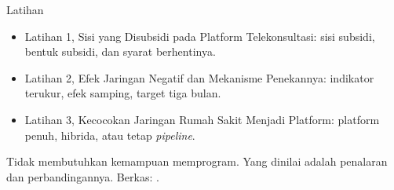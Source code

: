\documentclass[aspectratio=169, table, 12pt]{beamer}
\begin{document}
\begin{frame}{{\Large Latihan}}
  \vspace{6pt}
  \begin{itemize}
    \item Latihan 1, Sisi yang Disubsidi pada Platform Telekonsultasi: sisi subsidi, bentuk subsidi, dan syarat berhentinya.
    \item Latihan 2, Efek Jaringan Negatif dan Mekanisme Penekannya: indikator terukur, efek samping, target tiga bulan.
    \item Latihan 3, Kecocokan Jaringan Rumah Sakit Menjadi Platform: platform penuh, hibrida, atau tetap \textit{pipeline}.
  \end{itemize}
  \vspace{6pt}
  {\small Tidak membutuhkan kemampuan memprogram. Yang dinilai adalah penalaran dan perbandingannya. Berkas: .\par}
\end{frame}
\end{document}
